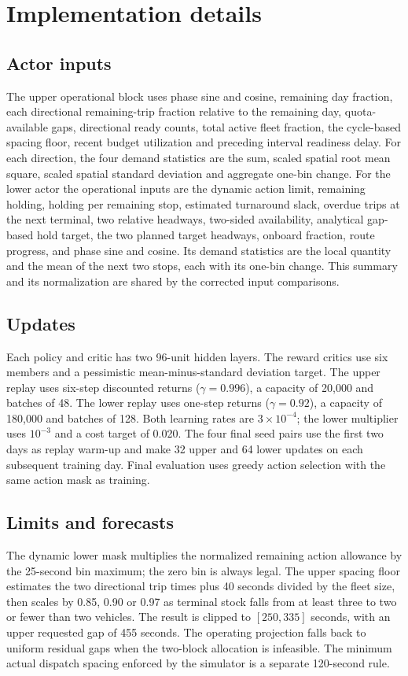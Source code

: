 \section{Implementation details}

\subsection{Actor inputs}
The upper operational block uses phase sine and
cosine, remaining day fraction, each directional remaining-trip fraction
relative to the remaining day, quota-available gaps, directional ready
counts, total active fleet fraction, the cycle-based spacing floor, recent
budget utilization and preceding interval readiness delay. For each
direction, the four demand statistics are the sum, scaled spatial root
mean square, scaled spatial standard deviation and aggregate one-bin
change. For the lower actor the operational inputs are the dynamic action
limit, remaining holding, holding per remaining stop, estimated turnaround
slack, overdue trips at the next terminal, two relative headways, two-sided
availability, analytical gap-based hold target, the two planned target
headways, onboard fraction, route progress, and phase sine and cosine.
Its demand statistics are the local quantity and the mean of the next
two stops, each with its one-bin change. This summary and its normalization
are shared by the corrected input comparisons.

\subsection{Updates}
Each policy and critic has two 96-unit hidden layers.
The reward critics use six members and a pessimistic mean-minus-standard
deviation target. The upper replay uses six-step discounted returns
($\gamma=0.996$), a capacity of 20,000 and batches of 48. The lower replay
uses one-step returns ($\gamma=0.92$), a capacity of 180,000 and batches of
128. Both learning rates are $3\times10^{-4}$; the lower multiplier uses
$10^{-3}$ and a cost target of 0.020. The four final seed pairs use the
first two days as replay warm-up and make 32 upper and 64 lower updates
on each subsequent training day. Final evaluation uses greedy action
selection with the same action mask as training.

\subsection{Limits and forecasts}
The dynamic lower mask multiplies the
normalized remaining action allowance by the 25-second bin maximum;
the zero bin is always legal. The upper spacing floor estimates the
two directional trip times plus 40 seconds divided by the fleet size,
then scales by 0.85, 0.90 or 0.97 as terminal stock falls from at least
three to two or fewer than two vehicles. The result is clipped to
$[250,335]$ seconds, with an upper requested gap of 455 seconds. The
operating projection falls back to uniform residual gaps when the
two-block allocation is infeasible. The minimum actual dispatch
spacing enforced by the simulator is a separate 120-second rule.
